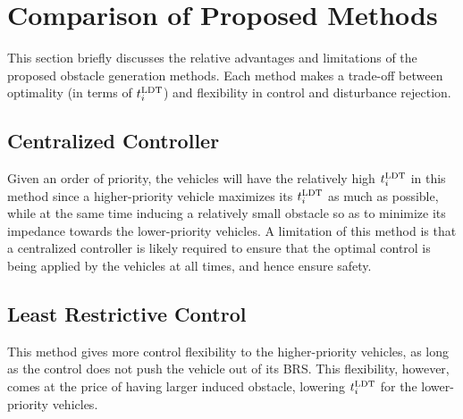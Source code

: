 %

\section{Comparison of Proposed Methods}
\vspace{-0.2em}
This section briefly discusses the relative advantages and limitations of the proposed obstacle generation methods. Each method makes a trade-off between optimality (in terms of $t^\text{LDT}_i$) and flexibility in control and disturbance rejection.

\subsection{Centralized Controller}
Given an order of priority, the vehicles will have the relatively high $t^\text{LDT}_i$ in this method since a higher-priority vehicle maximizes its $t^\text{LDT}_i$ as much as possible, while at the same time inducing a relatively small obstacle so as to minimize its impedance towards the lower-priority vehicles. 
A limitation of this method is that a centralized controller is likely required to ensure that the optimal control is being applied by the vehicles at all times, and hence ensure safety.

\subsection{Least Restrictive Control}
This method gives more control flexibility to the higher-priority vehicles, as long as the control does not push the vehicle out of its BRS. This flexibility, however, comes at the price of having larger induced obstacle, lowering $t^\text{LDT}_i$ for the lower-priority vehicles.  

